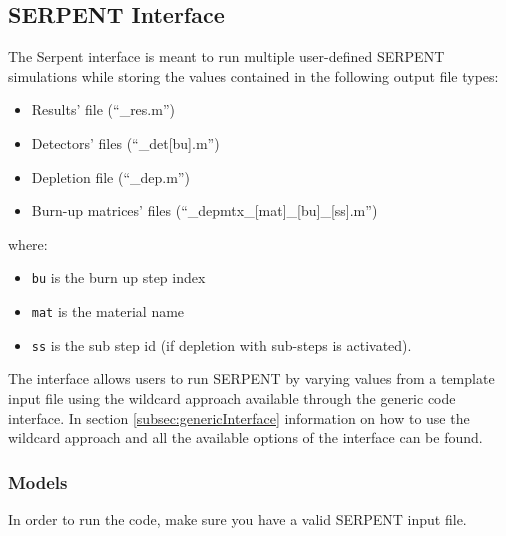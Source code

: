 
\subsection{SERPENT Interface}
\label{subsec:serpentInterface}
The Serpent interface is meant to run multiple user-defined SERPENT simulations
while storing the values contained in the following output file types: 
\begin{itemize}
\item Results' file (``\_res.m'')
\item Detectors' files  (``\_det[bu].m'')
\item Depletion file (``\_dep.m'')
\item Burn-up matrices' files (``\_depmtx\_[mat]\_[bu]\_[ss].m'')
\end{itemize}

where:
\begin{itemize}
\item  \texttt{bu} is the burn up step index
\item  \texttt{mat} is the material name
\item  \texttt{ss} is the sub step id (if depletion with sub-steps is activated).
\end{itemize}

The interface allows users to run SERPENT by varying values from a 
template input file using the wildcard approach available through the
generic code interface. In section \ref{subsec:genericInterface}  information
on how to use the wildcard approach and all the available options of the interface
can be found.

\subsubsection{Models}
\label{subsubsec:serpentInterfaceModels}
In order to run the code, make sure you have a valid SERPENT input file.


